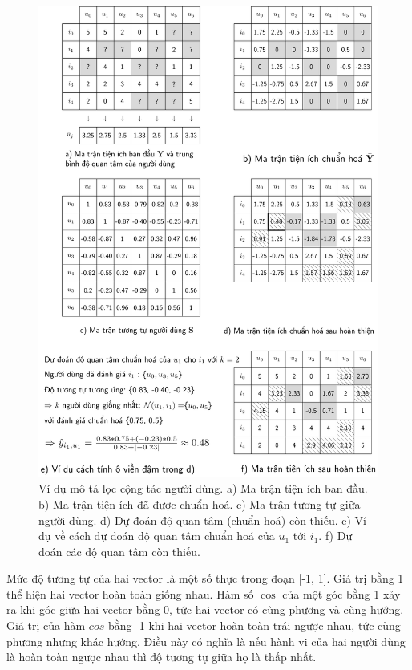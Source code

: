 \begin{figure}[t]
\centering
\includegraphics[width = .85\textwidth]{Chapters/06_RecommendationSystems/24_collaborativefiltering/latex/user_cf_gray_v.pdf}
\caption[]{Ví dụ mô tả lọc cộng tác người dùng. a) Ma trận tiện ích ban đầu. b) Ma trận tiện ích đã được chuẩn hoá. c) Ma trận tương tự giữa người dùng. d) Dự đoán độ quan tâm (chuẩn hoá) còn thiếu. e) Ví dụ về cách dự đoán độ quan tâm chuẩn hoá của $u_1$ tới $i_1$. f) Dự đoán các độ quan tâm còn thiếu.}
\label{fig:24_2}
\end{figure}

Mức độ tương tự của hai vector là một số thực trong đoạn [-1, 1]. Giá
trị bằng 1 thể hiện hai vector hoàn toàn giống nhau. Hàm số
${\cos}$ của một góc bằng 1 xảy ra khi góc giữa hai vector bằng 0, tức hai
vector có cùng phương và cùng hướng. Giá trị của hàm ${cos}$ bằng -1 khi hai
vector hoàn toàn trái ngược nhau, tức cùng phương nhưng khác hướng. Điều này có
nghĩa là nếu {hành vi} của hai người dùng là hoàn toàn
ngược nhau thì độ tương tự giữa họ là thấp nhất.

